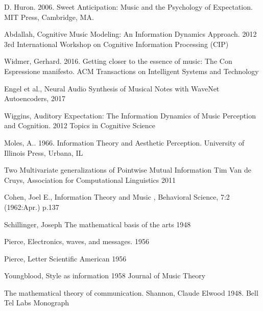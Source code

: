 \documentclass[final,authoryear,5p,times,twocolumn]{elsarticle}
\begin{document}
D. Huron. 2006. Sweet Anticipation: Music and the Psychology of Expectation. MIT Press, Cambridge, MA.

Abdallah, Cognitive Music Modeling: An Information Dynamics Approach. 2012 3rd International Workshop on Cognitive Information Processing (CIP)

Widmer, Gerhard. 2016. Getting closer to the essence of music: The Con Espressione manifesto. ACM Transactions on Intelligent Systems and Technology

Engel et al., Neural Audio Synthesis of Musical Notes with WaveNet Autoencoders, 2017

Wiggins, Auditory Expectation: The Information Dynamics of Music Perception and Cognition. 2012 Topics in Cognitive Science

Moles, A.. 1966. Information Theory and Aesthetic Perception. University of Illinois Press, Urbana, IL

Two Multivariate generalizations of Pointwise Mutual Information Tim Van de Cruys, Association for Computational Linguistics 2011

Cohen, Joel E., Information Theory and Music , Behavioral Science, 7:2 (1962:Apr.) p.137

Schillinger, Joseph The mathematical basis of the arts 1948

Pierce, Electronics, waves, and messages. 1956

Pierce, Letter Scientific American 1956

Youngblood, Style as information 1958 Journal of Music Theory

The mathematical theory of communication. Shannon, Claude Elwood 1948. Bell Tel Labs Monograph







\end{document}
